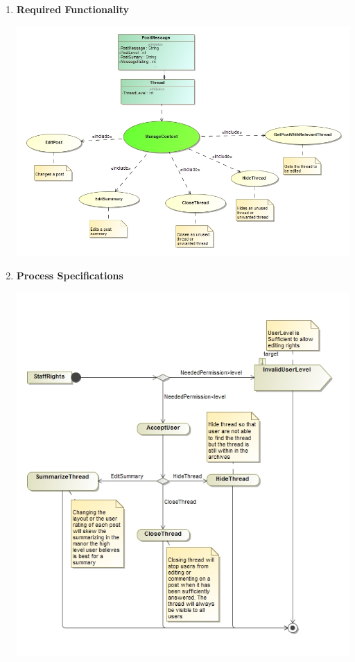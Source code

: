 \documentclass[11pt]{article}
\begin{document}
\begin{enumerate}
			 \item	\textbf{Required Functionality}
			 	  		\begin{center}
			 	  			\includegraphics[scale=0.5]{Diagrams/B2 UseCase.png}
			 	  		\end{center}
	\newpage
			 \item \textbf{Process Specifications}
			 	  		\begin{center}
			 	  			\includegraphics[scale=0.5]{Diagrams/B2 Activity.png}
			 	  		\end{center}
			 
				
		\end{enumerate}
 \newpage
\end{document}
